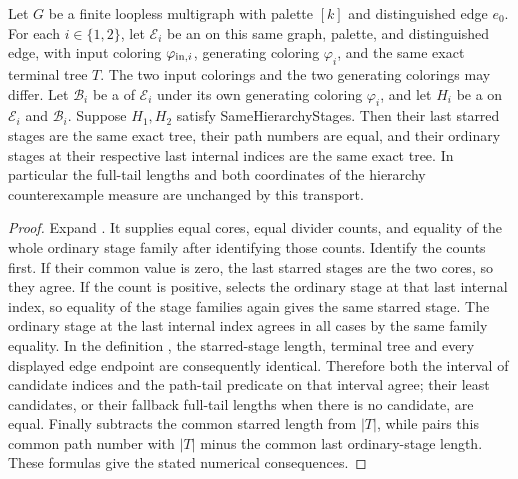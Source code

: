 \begin{lemma}
Let $G$ be a finite loopless multigraph with palette $[k]$ and
distinguished edge $e_0$. For each $i\in\{1,2\}$, let $\mathcal E_i$ be
an  on this same graph, palette, and
distinguished edge, with input coloring $\varphi_{{\rm in},i}$,
generating coloring $\varphi_i$, and the same exact terminal tree $T$.
The two input colorings and the two generating colorings may differ.
Let $\mathcal B_i$ be a  of $\mathcal E_i$
under its own generating coloring $\varphi_i$, and let $H_i$ be a
 on $\mathcal E_i$ and $\mathcal B_i$.
Suppose $H_1,H_2$ satisfy SameHierarchyStages. Then their last starred
stages are the same exact tree, their path numbers are equal, and their ordinary stages at
their respective last internal indices are the same exact tree. In
particular the full-tail lengths and both coordinates of the hierarchy
counterexample measure are unchanged by this transport.
\end{lemma}
\begin{proof}
Expand . It supplies equal cores, equal
divider counts, and equality of the whole ordinary stage family after
identifying those counts. Identify the counts first. If their common
value is zero, the last starred stages are the two cores, so they agree.
If the count is positive,  selects the
ordinary stage at that last internal index, so equality of the stage
families again gives the same starred stage. The ordinary stage at the
last internal index agrees in all cases by the same family equality.
In the definition , the starred-stage
length, terminal tree and every displayed edge endpoint are consequently
identical. Therefore both the interval of candidate indices and the
path-tail predicate on that interval agree; their least candidates, or
their fallback full-tail lengths when there is no candidate, are equal.
Finally  subtracts the common starred
length from $|T|$, while  pairs
this common path number with $|T|$ minus the common last ordinary-stage
length. These formulas give the stated numerical consequences.
\end{proof}
